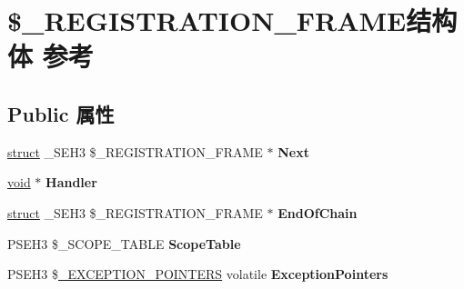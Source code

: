 \hypertarget{struct_0B___r_e_g_i_s_t_r_a_t_i_o_n___f_r_a_m_e}{}\section{\$\+\_\+\+R\+E\+G\+I\+S\+T\+R\+A\+T\+I\+O\+N\+\_\+\+F\+R\+A\+M\+E结构体 参考}
\label{struct_0B___r_e_g_i_s_t_r_a_t_i_o_n___f_r_a_m_e}
\subsection*{Public 属性}
\begin{DoxyCompactItemize}
\item 
\mbox{\label{struct_0B___r_e_g_i_s_t_r_a_t_i_o_n___f_r_a_m_e_a2bef53972a297c7a0ec85d3bf2c11c00}} 
\hyperlink{interfacestruct}{struct} \+\_\+\+S\+E\+H3 \$\+\_\+\+R\+E\+G\+I\+S\+T\+R\+A\+T\+I\+O\+N\+\_\+\+F\+R\+A\+ME $\ast$ {\bfseries Next}
\item 
\mbox{\label{struct_0B___r_e_g_i_s_t_r_a_t_i_o_n___f_r_a_m_e_a0926b8e42ea9223d200c783d599e64d4}} 
\hyperlink{interfacevoid}{void} $\ast$ {\bfseries Handler}
\item 
\mbox{\label{struct_0B___r_e_g_i_s_t_r_a_t_i_o_n___f_r_a_m_e_a396e4667c2013b625c4c3550c0410837}} 
\hyperlink{interfacestruct}{struct} \+\_\+\+S\+E\+H3 \$\+\_\+\+R\+E\+G\+I\+S\+T\+R\+A\+T\+I\+O\+N\+\_\+\+F\+R\+A\+ME $\ast$ {\bfseries End\+Of\+Chain}
\item 
\mbox{\label{struct_0B___r_e_g_i_s_t_r_a_t_i_o_n___f_r_a_m_e_adf0f2978c4df9e4a4388ffa035f53d13}} 
P\+S\+E\+H3 \$\+\_\+\+S\+C\+O\+P\+E\+\_\+\+T\+A\+B\+LE {\bfseries Scope\+Table}
\item 
\mbox{\label{struct_0B___r_e_g_i_s_t_r_a_t_i_o_n___f_r_a_m_e_ad3c144ba77705d65571fb661cc388179}} 
P\+S\+E\+H3 \$\hyperlink{struct___e_x_c_e_p_t_i_o_n___p_o_i_n_t_e_r_s}{\+\_\+\+E\+X\+C\+E\+P\+T\+I\+O\+N\+\_\+\+P\+O\+I\+N\+T\+E\+RS} volatile {\bfseries Exception\+Pointers}
\item 

\end{DoxyCompactItemize}
